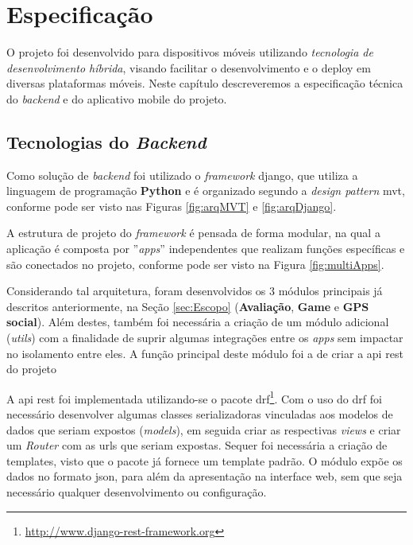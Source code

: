 \chapter{Especificação}\label{chp:Especificação}
O projeto foi desenvolvido para dispositivos móveis utilizando \textit{tecnologia de desenvolvimento híbrida}, visando facilitar o desenvolvimento e o deploy em diversas plataformas móveis. Neste capítulo descreveremos a especificação técnica do \textit{backend} e do aplicativo mobile do projeto.

\section{Tecnologias do \textit{Backend}}\label{sec:spec-backend}
Como solução de \textit{backend} foi utilizado o \textit{framework} \gls{django}, que utiliza a linguagem de programação \textbf{Python} e é organizado segundo a \textit{design pattern} \gls{mvt}, conforme pode ser visto nas Figuras \ref{fig:arqMVT} e \ref{fig:arqDjango}.%
%
%
%

A estrutura de projeto do \textit{framework} é pensada de forma modular, na qual a aplicação é composta por ''\textit{apps}'' independentes que realizam funções específicas e são conectados no projeto, conforme pode ser visto na Figura \ref{fig:multiApps}.%
%

Considerando tal arquitetura, foram desenvolvidos os 3 módulos principais já descritos anteriormente, na Seção \ref{sec:Escopo} (\textbf{Avaliação}, \textbf{Game} e \textbf{GPS social}). Além destes, também foi necessária a criação de um módulo adicional (\textit{utils}) com a finalidade de suprir algumas integrações entre os \textit{apps} sem impactar no isolamento entre eles. A função principal deste módulo foi a de criar a \gls{api} \gls{rest} do projeto

A \gls{api} \gls{rest} foi implementada utilizando-se o pacote \gls{drf}\footnote{\url{http://www.django-rest-framework.org}}. Com o uso do \gls{drf} foi necessário desenvolver algumas classes serializadoras vinculadas aos modelos de dados que seriam expostos (\textit{models}), em seguida criar as respectivas \textit{views} e criar um \textit{Router} com as urls que seriam expostas. Sequer foi necessária a criação de templates, visto que o pacote já fornece um template padrão. O módulo expõe os dados no formato \gls{json}, para além da apresentação na interface web, sem que seja necessário qualquer desenvolvimento ou configuração.

